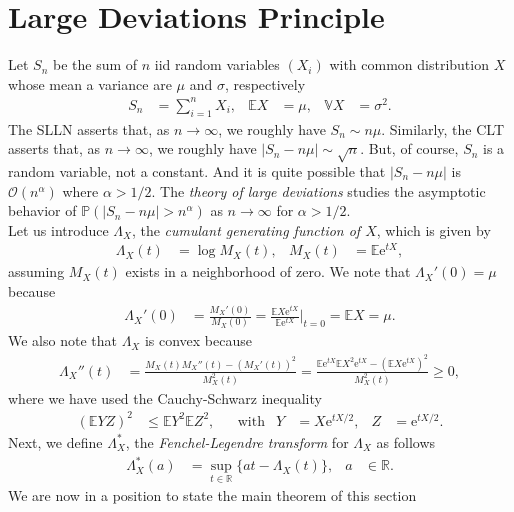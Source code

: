 \documentclass[12pt]{book}
\numberwithin{equation}{chapter}
\theoremstyle{plain}
\numberwithin{theorem}{section}
\theoremstyle{definition}
\numberwithin{exercise}{chapter}
\newcommand{\<}{\langle}
\renewcommand{\>}{\rangle}
\renewcommand{\(}{\left(}
\renewcommand{\)}{\right)}
\renewcommand{\[}{\left[}
\renewcommand{\]}{\right]}
\newcommand\Eb{\mathds{E}}
\newcommand\Pb{\mathds{P}}
\newcommand\Rb{\mathds{R}}
\newcommand\Vb{\mathds{V}}
\newcommand\Oc{\mathscr{O}}
\newcommand\sig{\sigma}
\newcommand\Lam{\Lambda}
\newcommand\ee{\mathrm{e}}
\begin{document}
\section{Large Deviations Principle}
\label{sec:ldp}
Let $S_n$ be the sum of $n$ iid random variables $(X_i)$ with common distribution $X$ whose mean a variance are $\mu$ and $\sig$, respectively
\begin{align}
S_n
	&=	\sum_{i=1}^n X_i , &
\Eb X
	&=	\mu , &
\Vb X
	&=	\sig^2 .
\end{align}
The SLLN asserts that, as $n \to \infty$, we roughly have $S_n \sim n \mu$.
Similarly, the CLT asserts that, as $n \to \infty$, we roughly have $| S_n - n \mu | \sim \sqrt{n}$.
But, of course, $S_n$ is a random variable, not a constant.  And it is quite possible that $| S_n - n \mu|$ is $\Oc( n^\alpha )$ where $\alpha > 1/2$.  
The \emph{theory of large deviations} studies the asymptotic behavior of $\Pb( |S_n - n \mu| > n^\alpha )$ as $n \to \infty$ for $\alpha > 1/2$.
\\[0.5em]
Let us introduce $\Lam_X$, the \emph{cumulant generating function of $X$}, which is given by
\begin{align}
\Lam_X(t)
	&=	\log M_X(t) , &
M_X(t)
	&=	\Eb \ee^{t X} , \label{eq:cumulant}
\end{align}
assuming $M_X(t)$ exists in a neighborhood of zero.
We note that $\Lam_X'(0) = \mu$ because
\begin{align}
\Lam_X'(0)
	&=	\frac{M_X'(0)}{M_X(0)} =  \frac{ \Eb X \ee^{t X} }{\Eb \ee^{t X} } \Big|_{t=0} = \Eb X = \mu .
\end{align}
We also note that $\Lam_X$ is convex because
\begin{align}
\Lam_X''(t)
	&=	\frac{ M_X(t) M_X''(t) - ( M_X'(t))^2 }{ M_X^2(t) }
	=		\frac{ \Eb \ee^{t X} \Eb X^2 \ee^{t X} - ( \Eb X \ee^{t X} )^2 }{ M_X^2(t) } \geq 0 , \label{eq:note0}
\end{align}
where we have used the Cauchy-Schwarz inequality
\begin{align}
( \Eb Y Z )^2
	&\leq \Eb Y^2 \Eb Z^2, &
	&\text{with}&
Y
	&= X \ee^{t X/2}, &
Z
	&=	\ee^{t X/2} .
\end{align}
Next, we define $\Lam_X^*$, the \emph{Fenchel-Legendre transform} for $\Lam_X$ as follows
\begin{align}
\Lam_X^*(a)
	&=	\sup_{t \in \Rb} \{ a t - \Lam_X(t) \} , &
a
	&\in \Rb . \label{eq:legendre.transform}
\end{align}
We are now in a position to state the main theorem of this section
\end{document}
